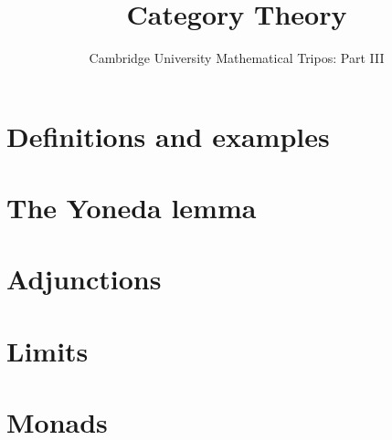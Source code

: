 \documentclass{article}
\title{Category Theory}
\author{Cambridge University Mathematical Tripos: Part III}
\begin{document}
\maketitle

\tableofcontentsnewpage{}

\section{Definitions and examples}

\section{The Yoneda lemma}

\section{Adjunctions}

\section{Limits}

\section{Monads}

\end{document}
